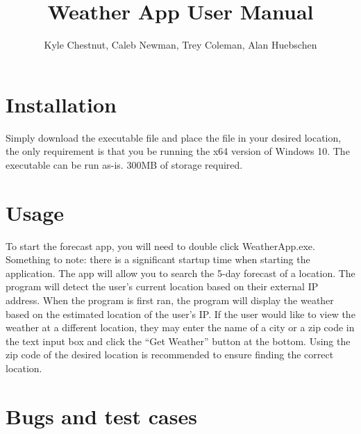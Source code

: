 \documentclass[12pt, titlepage]{article}
\title{Weather App User Manual}
\author{Kyle Chestnut, Caleb Newman, Trey Coleman, Alan Huebschen}
\begin{document}
\maketitle

\section*{Installation}

Simply download the executable file and place the file in your desired location, the only requirement is that you be running the x64 version of Windows 10. The executable can be run as-is. 300MB of storage required.

\section*{Usage}

To start the forecast app, you will need to double click WeatherApp.exe. Something to note: there is a significant startup time when starting the application. The app will allow you to search the 5-day forecast of a location. The program will detect the user’s current location based on their external IP address. When the program is first ran, the program will display the weather based on the estimated location of the user’s IP. If the user would like to view the weather at a different location, they may enter the name of a city or a zip code in the text input box and click the “Get Weather” button at the bottom. Using the zip code of the desired location is recommended to ensure finding the correct location.


\section{Bugs and test cases}
\end{document}
